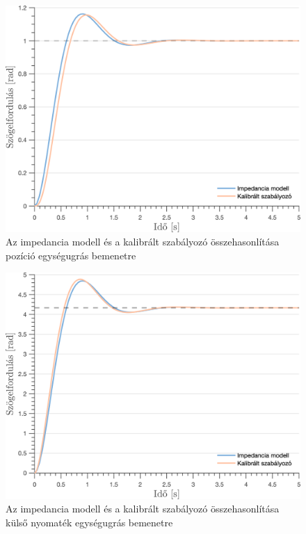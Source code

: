 \begin{figure}[!htb]
    \begin{center}
    \includegraphics[width=13cm]{images/observer_controller_pos_resp_direct_comp_calib.png}
    \caption{Az impedancia modell és a kalibrált szabályozó összehasonlítása pozíció egységugrás bemenetre}\label{fig:observer_controller_pos_resp_direct_calib}
    \end{center}
\end{figure}
\begin{figure}[H]
    \begin{center}
    \includegraphics[width=13cm]{images/observer_controller_torque_resp_direct_comp_calib.png}
    \caption{Az impedancia modell és a kalibrált szabályozó összehasonlítása külső nyomaték egységugrás bemenetre}\label{fig:observer_controller_torque_resp_direct_calib}
    \end{center}
\end{figure}

